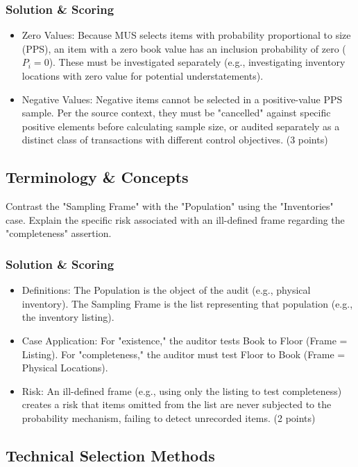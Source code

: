 \documentclass[12pt,a4paper]{memoir}
\begin{document}
\subsubsection{Solution \& Scoring}
\begin{itemize}
\item Zero Values: Because MUS selects items with probability proportional to size (PPS), an item with a zero book value has an inclusion probability of zero ($P_i = 0$). These must be investigated separately (e.g., investigating inventory locations with zero value for potential understatements).
\item Negative Values: Negative items cannot be selected in a positive-value PPS sample. Per the source context, they must be "cancelled" against specific positive elements before calculating sample size, or audited separately as a distinct class of transactions with different control objectives. (3 points)
\end{itemize}

\subsection{Terminology \& Concepts}

Contrast the "Sampling Frame" with the "Population" using the "Inventories" case. Explain the specific risk associated with an ill-defined frame regarding the "completeness" assertion.

\subsubsection{Solution \& Scoring}
\begin{itemize}
\item Definitions: The Population is the object of the audit (e.g., physical inventory). The Sampling Frame is the list representing that population (e.g., the inventory listing).
\item Case Application: For "existence," the auditor tests Book to Floor (Frame = Listing). For "completeness," the auditor must test Floor to Book (Frame = Physical Locations).
\item Risk: An ill-defined frame (e.g., using only the listing to test completeness) creates a risk that items omitted from the list are never subjected to the probability mechanism, failing to detect unrecorded items. (2 points)
\end{itemize}

\subsection{Technical Selection Methods}
\end{document}
